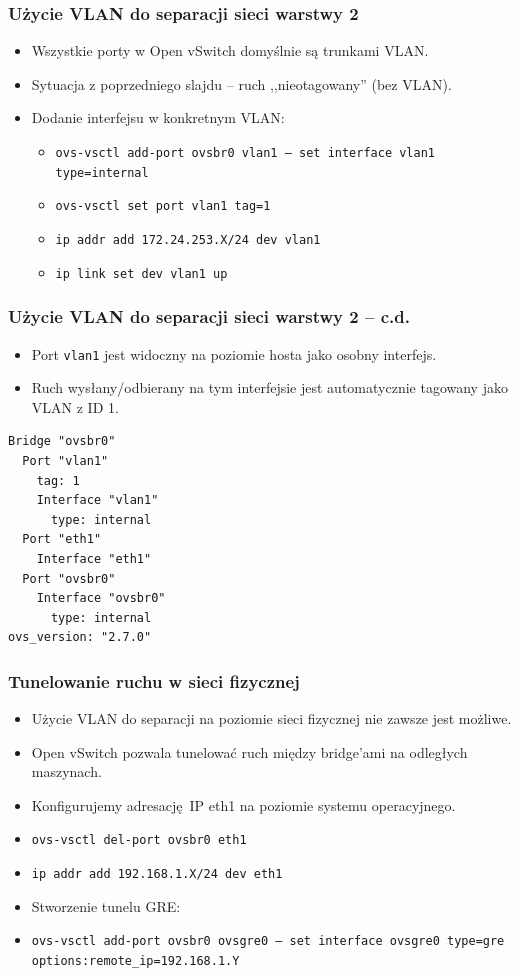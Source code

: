 \documentclass[dvipsnames,table]{beamer}
\begin{document}
\begin{frame}
\frametitle{Użycie VLAN do separacji sieci warstwy 2}
\begin{itemize}
	\item Wszystkie porty w Open vSwitch domyślnie są trunkami VLAN.
	\item Sytuacja z poprzedniego slajdu -- ruch ,,nieotagowany'' (bez VLAN).
	\item Dodanie interfejsu w konkretnym VLAN:
	\begin{itemize}
		\item {\tt ovs-vsctl add-port ovsbr0 vlan1 -- set interface vlan1 type=internal}
		\item {\tt ovs-vsctl set port vlan1 tag=1}
		\item {\tt ip addr add 172.24.253.X/24 dev vlan1}
		\item {\tt ip link set dev vlan1 up}
	\end{itemize}
\end{itemize}
\end{frame}

\begin{frame}[fragile]
\frametitle{Użycie VLAN do separacji sieci warstwy 2 -- c.d.}
\begin{itemize}
	\item Port {\tt vlan1} jest widoczny na poziomie hosta jako osobny interfejs. 
	\item Ruch wysłany/odbierany na tym interfejsie jest automatycznie tagowany jako VLAN z ID 1.
\end{itemize}
\scriptsize
\begin{verbatim}
Bridge "ovsbr0"
  Port "vlan1"
    tag: 1 
    Interface "vlan1"
      type: internal
  Port "eth1"
    Interface "eth1"
  Port "ovsbr0"
    Interface "ovsbr0"
      type: internal
ovs_version: "2.7.0"
\end{verbatim}	
\end{frame}

\begin{frame}
\frametitle{Tunelowanie ruchu w sieci fizycznej}
\begin{itemize}
	\item Użycie VLAN do separacji na poziomie sieci fizycznej nie zawsze jest możliwe.
	\item Open vSwitch pozwala tunelować ruch między bridge'ami na odległych maszynach.
	\item Konfigurujemy adresację IP eth1 na poziomie systemu operacyjnego.
	\item {\tt ovs-vsctl del-port ovsbr0 eth1}
	\item {\tt ip addr add 192.168.1.X/24 dev eth1}
	\item Stworzenie tunelu GRE:
	\item {\tt ovs-vsctl add-port ovsbr0 ovsgre0 -- set interface ovsgre0 type=gre options:remote\_ip=192.168.1.Y}
\end{itemize}
\end{frame}
\end{document}
